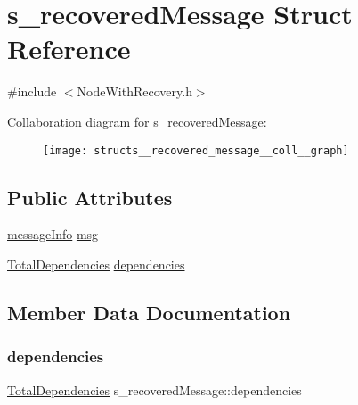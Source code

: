\hypertarget{structs__recovered_message}{}\section{s\+\_\+recovered\+Message Struct Reference}
\label{structs__recovered_message}


{\ttfamily \#include $<$Node\+With\+Recovery.\+h$>$}



Collaboration diagram for s\+\_\+recovered\+Message\+:\nopagebreak
\begin{figure}[H]
\begin{center}
\leavevmode
\texttt{[image: structs\_\_recovered\_message\_\_coll\_\_graph]}
\end{center}
\end{figure}
\subsection*{Public Attributes}
\begin{DoxyCompactItemize}
\item 
\hyperlink{structures_8h_a7e7bdc1d2fff8a9436f2f352b2711ed6}{message\+Info} \hyperlink{structs__recovered_message_a585360581eb2222b2a9ec5b91076054a}{msg}
\item 
\hyperlink{class_total_dependencies}{Total\+Dependencies} \hyperlink{structs__recovered_message_a95db2608749458c7b7e70bd5b612ba2d}{dependencies}
\end{DoxyCompactItemize}


\subsection{Member Data Documentation}
\mbox{\label{structs__recovered_message_a95db2608749458c7b7e70bd5b612ba2d}} 
\subsubsection{\texorpdfstring{dependencies}{dependencies}}
{\footnotesize\ttfamily \hyperlink{class_total_dependencies}{Total\+Dependencies} s\+\_\+recovered\+Message\+::dependencies}

\mbox{\label{structs__recovered_message_a585360581eb2222b2a9ec5b91076054a}} 
